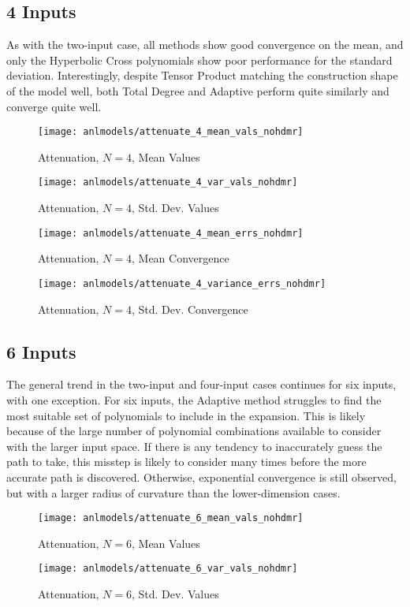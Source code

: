\subsection{4 Inputs}
As with the two-input case, all methods show good convergence on the mean, and only the Hyperbolic Cross
polynomials show poor performance for the standard deviation.  Interestingly, despite Tensor Product matching
the construction shape of the model well, both Total Degree and Adaptive perform quite similarly and converge
quite well.
\begin{figure}[H]
  \centering
  \texttt{[image: anlmodels/attenuate\_4\_mean\_vals\_nohdmr]}
  \caption{Attenuation, $N=4$, Mean Values}
  \label{fig:attenuate mean values 4}
\end{figure}
\begin{figure}[H]
  \centering
  \texttt{[image: anlmodels/attenuate\_4\_var\_vals\_nohdmr]}
  \caption{Attenuation, $N=4$, Std. Dev. Values}
  \label{fig:attenuate var values 4}
\end{figure}

\begin{figure}[H]
  \centering
  \texttt{[image: anlmodels/attenuate\_4\_mean\_errs\_nohdmr]}
  \caption{Attenuation, $N=4$, Mean Convergence}
  \label{fig:attenuate mean errors 4}
\end{figure}
\begin{figure}[H]
  \centering
  \texttt{[image: anlmodels/attenuate\_4\_variance\_errs\_nohdmr]}
  \caption{Attenuation, $N=4$, Std. Dev. Convergence}
  \label{fig:attenuate var errors 4}
\end{figure}

\subsection{6 Inputs}
The general trend in the two-input and four-input cases continues for six inputs, with one exception.  For six
inputs, the Adaptive method struggles to find the most suitable set of polynomials to include in the
expansion.  This is likely because of the large number of polynomial combinations available to consider 
with the larger input space.  If there is any tendency to inaccurately guess the path to take, this misstep is
likely to consider many times before the more accurate path is discovered.  Otherwise, exponential convergence
is still observed, but with a larger radius of curvature than the lower-dimension cases.
\begin{figure}[H]
  \centering
  \texttt{[image: anlmodels/attenuate\_6\_mean\_vals\_nohdmr]}
  \caption{Attenuation, $N=6$, Mean Values}
  \label{fig:attenuate mean values 6}
\end{figure}
\begin{figure}[H]
  \centering
  \texttt{[image: anlmodels/attenuate\_6\_var\_vals\_nohdmr]}
  \caption{Attenuation, $N=6$, Std. Dev. Values}
  \label{fig:attenuate var values 6}
\end{figure}

